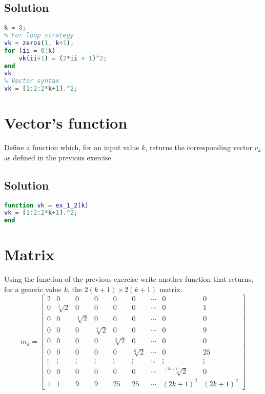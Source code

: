 \documentclass[12pt, a4paper]{report}
\newtheorem[style=M,bodystyle=\normalfont]{theorem}{Theorem}
\newtheorem[style=M,bodystyle=\normalfont]{corollary}{Corollary}
\newtheorem[style=M,bodystyle=\normalfont]{lemma}{Lemma}
\newtheorem[style=M,bodystyle=\normalfont]{definition}{Definition}
\begin{document}
    \subsection*{Solution}
        \begin{lstlisting}[language=Matlab]
k = 8;
% For loop strategy
vk = zeros(1, k+1);
for (ii = 0:k)
    vk(ii+1) = (2*ii + 1)^2;
end
vk
% Vector syntax
vk = [1:2:2*k+1].^2;            
        \end{lstlisting}  

    \newpage

    \section{Vector's function}
        Define a function which, for an input value $k$, returns the corresponding vector $v_k$ as defined in the previous exercise.
    \subsection*{Solution}
        \begin{lstlisting}[language=Matlab]
function vk = ex_1_2(k)
vk = [1:2:2*k+1].^2;
end
        \end{lstlisting}

    \newpage

    \section{Matrix}
        Using the function of the previous exercise write another function that returns, for a generic value $k$, the $2(k + 1) \times 2(k + 1)$ matrix.
        \[
            m_k=
            \begin{bmatrix}
                2 & 0 & 0 & 0 & 0 & 0 & \cdots & 0 & 0 \\
                0 & \sqrt[2]{2} & 0 & 0 & 0 & 0 & \cdots & 0 & 1 \\
                0 & 0 & \sqrt[3]{2} & 0 & 0 & 0 & \cdots & 0 & 0 \\
                0 & 0 & 0 & \sqrt[4]{2} & 0 & 0 & \cdots & 0 & 9 \\
                0 & 0 & 0 & 0 & \sqrt[5]{2} & 0 & \cdots & 0 & 0 \\
                0 & 0 & 0 & 0 & 0 & \sqrt[6]{2} & \cdots & 0 & 25 \\
                \vdots  & \vdots  & \vdots  & \vdots  & \vdots  & \vdots  & \ddots & \vdots  & \vdots  \\
                0 & 0 & 0 & 0 & 0 & 0 & \cdots & \sqrt[(2k+1)]{2} & 0 \\
                1 & 1 & 9 & 9 & 25 & 25 & \cdots & (2k+1)^2 & (2k+1)^2 
            \end{bmatrix} 
        \]
\end{document}
